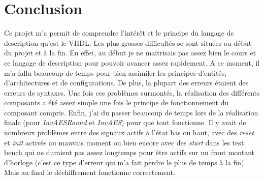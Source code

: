\documentclass[a4paper, 12pt]{article}
\begin{document}
\section{Conclusion}
Ce projet m'a permit de comprendre l'intérêt et le principe du langage de description qu'est le VHDL. Les plus grosses difficultés se sont situées au début du projet et à la fin. En effet, au début je ne maitrisais pas assez bien le cours et ce langage de description pour pouvoir avancer assez rapidement. A ce moment, il m'a fallu beaucoup de temps pour bien assimiler les principes d'entités, d'architectures et de configurations. De plus, la plupart des erreurs étaient des erreurs de syntaxes. Une fois ces problèmes surmontés, la réalisation des différents composants a été assez simple une fois le principe de fonctionnement du composant compris. Enfin, j'ai du passer beaucoup de temps lors de la réalisation finale (pour \emph{InvAESRound} et \emph{InvAES}) pour que tout fonctionne. Il y avait de nombreux problèmes entre des signaux actifs à l'état bas ou haut, avec des \emph{reset} et \emph{init} activés au mauvais moment ou bien encore avec des \emph{start} dans les test bench qui ne duraient pas assez longtemps pour être actifs sur un front montant d'horloge (c'est ce type d'erreur qui m'a fait perdre le plus de temps à la fin).\\ Mais au final le déchiffrement fonctionne correctement.

\newpage

\newpage
\listoffigures
\listoftables
\end{document}
